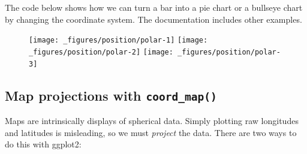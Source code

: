 The code below shows how we can turn a bar into a pie chart or a
bullseye chart by changing the coordinate system. The documentation
includes other examples. 
 

\begin{Shaded}
\begin{Highlighting}[]
\StringTok{ }\NormalTok{(}\NormalTok{(}\NormalTok{), } 
\StringTok{  }\NormalTok{(} \NormalTok{) +}\StringTok{ }
\StringTok{  }\NormalTok{(} \NormalTok{) +}\StringTok{ }
\StringTok{  }\NormalTok{(}\NormalTok{, } \NormalTok{(}\NormalTok{, }\NormalTok{)) +}
\StringTok{  }\NormalTok{(}\NormalTok{, } \NormalTok{(}\NormalTok{, }\NormalTok{))}


\StringTok{ }\NormalTok{(} \NormalTok{)}

\StringTok{ }\NormalTok{()}
\end{Highlighting}
\end{Shaded}

\begin{figure}[H]
  \texttt{[image: \_figures/position/polar-1]}%
  \texttt{[image: \_figures/position/polar-2]}%
  \texttt{[image: \_figures/position/polar-3]}
\end{figure}

\subsection{\texorpdfstring{Map projections with
\texttt{coord\_map()}}{Map projections with coord\_map()}}\label{map-projections-with-coordux5fmap}

Maps are intrinsically displays of spherical data. Simply plotting raw
longitudes and latitudes is misleading, so we must \emph{project} the
data. There are two ways to do this with ggplot2:
 
  

